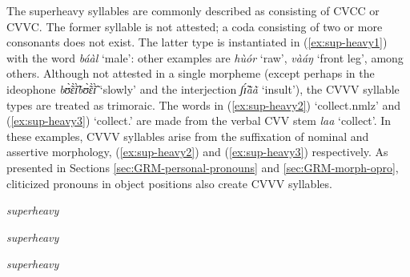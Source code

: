 The superheavy syllables are commonly described as consisting of CVCC or CVVC.
The former syllable is not attested; a coda consisting of two or more consonants
does not exist. The latter type is instantiated in (\ref{ex:sup-heavy1}) with
 the word {\it báàl} `male':  other examples are {\it hùór} `raw',  
{\it vàáŋ} `front leg', among others.  Although not attested in a single
morpheme (except perhaps in the ideophone {\it  bʊ̃̀ɛ̃̀ɪ̃̀bʊ̃̀ɛ̃̀ɪ̃̀} `slowly' 
and the interjection {\it ʃɪ̃́ã̀ã̀} `insult'),    the CVVV syllable types are 
treated as trimoraic. The words in
(\ref{ex:sup-heavy2}) `collect.{\sc nmlz}'  and  (\ref{ex:sup-heavy3}) 
`collect.{\foc}'
are made from the verbal CVV stem {\it laa} `collect'. In these examples,  CVVV 
syllables
arise  from the suffixation of nominal 
and assertive  morphology, 
(\ref{ex:sup-heavy2}) and (\ref{ex:sup-heavy3}) respectively. As presented in 
Sections
\ref{sec:GRM-personal-pronouns} and \ref{sec:GRM-morph-opro}, cliticized
pronouns in object positions also
create CVVV syllables.


\begin{exe}
\ex\label{exe:superheavy}
\begin{multicols}{3}
\begin{xlist}

\ex\label{ex:sup-heavy1}{\it superheavy}\\
{}


\ex\label{ex:sup-heavy2}{\it superheavy}\\
{}



\ex\label{ex:sup-heavy3}{\it superheavy}\\
{}

\end{xlist}
\end{multicols}
\end{exe}

